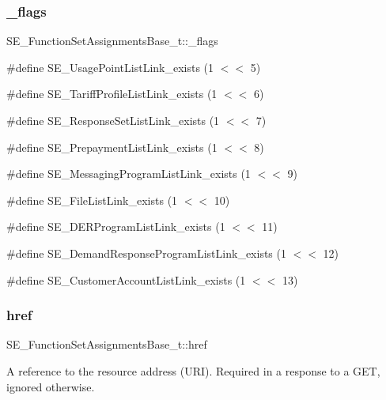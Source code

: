 \subsubsection{\texorpdfstring{\+\_\+flags}{\_flags}}
{\footnotesize\ttfamily S\+E\+\_\+\+Function\+Set\+Assignments\+Base\+\_\+t\+::\+\_\+flags}

\#define S\+E\+\_\+\+Usage\+Point\+List\+Link\+\_\+exists (1 $<$$<$ 5)

\#define S\+E\+\_\+\+Tariff\+Profile\+List\+Link\+\_\+exists (1 $<$$<$ 6)

\#define S\+E\+\_\+\+Response\+Set\+List\+Link\+\_\+exists (1 $<$$<$ 7)

\#define S\+E\+\_\+\+Prepayment\+List\+Link\+\_\+exists (1 $<$$<$ 8)

\#define S\+E\+\_\+\+Messaging\+Program\+List\+Link\+\_\+exists (1 $<$$<$ 9)

\#define S\+E\+\_\+\+File\+List\+Link\+\_\+exists (1 $<$$<$ 10)

\#define S\+E\+\_\+\+D\+E\+R\+Program\+List\+Link\+\_\+exists (1 $<$$<$ 11)

\#define S\+E\+\_\+\+Demand\+Response\+Program\+List\+Link\+\_\+exists (1 $<$$<$ 12)

\#define S\+E\+\_\+\+Customer\+Account\+List\+Link\+\_\+exists (1 $<$$<$ 13) \mbox{\label{group__FunctionSetAssignmentsBase_ga1e4079acb45b90e4b02778ab5c0e7147}} 
\subsubsection{\texorpdfstring{href}{href}}
{\footnotesize\ttfamily S\+E\+\_\+\+Function\+Set\+Assignments\+Base\+\_\+t\+::href}

A reference to the resource address (U\+RI). Required in a response to a G\+ET, ignored otherwise. 